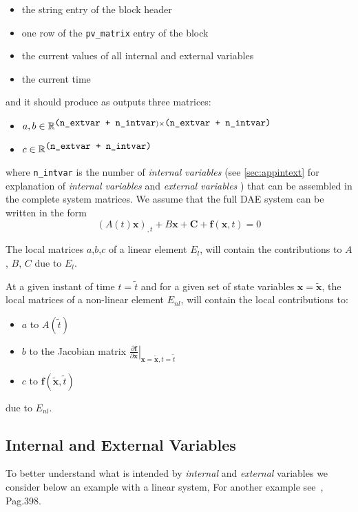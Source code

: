 \documentclass{scrartcl}
\begin{document}
\begin{itemize}
\item  the string entry of the block header
\item  one row of the {\tt pv\_matrix} entry of the block
\item  the current values of all internal and external variables
\item  the current time
\end{itemize} 

and it should produce as outputs three matrices: 
\begin{itemize}
\item  $a,b \in \mathbb{R}^{
\mbox{\tt (n\_extvar + n\_intvar})\times \mbox{\tt (n\_extvar + n\_intvar)}}$ 
\item $c\in \mathbb{R}^{\mbox{\tt (n\_extvar + n\_intvar)}} $ 
\end{itemize}


where {\tt n\_intvar} is the number of \emph{internal variables} 
(see \autoref{sec:appintext} for explanation of \emph{internal variables} and
 \emph{external variables} )
that can be assembled in the complete system matrices.
We assume that the full DAE system can be written in the form
\begin{equation}\label{eqdaesystem}
\left(A(t) \mathbf{x}\right)_{,t} + 
B \mathbf{x} + \mathbf{C} + \mathbf{f}(\mathbf{x},t)= 0
\end{equation}

The local matrices $a$,$b$,$c$ of a linear element $E_{l}$, 
will contain the contributions to $A$, $B$, $C$  due to
$E_{l}$.

At a given instant of time $t=\tilde{t}$ and for a given set of state 
variables $\mathbf{x}=\mathbf{\tilde{x}}$,
the local matrices of a non-linear element $E_{nl}$, 
will contain the local contributions to:
\begin{itemize}
\item $a$ to $A(\tilde{t})$
\item $b$ to the Jacobian matrix 
$\left.\frac{\partial \mathbf{f}}{\partial\mathbf{x}}\right|_{\mathbf{x}=
  \mathbf{\tilde{x}},t=\tilde{t}}$ 
\item $c$ to $\mathbf{f}(\mathbf{\tilde{x}},\tilde{t})$ 
\end{itemize}
due to $E_{nl}$.


\subsection{Internal and External Variables}\label{sec:appintext}
To better understand what is intended by \emph{internal} and \emph{external}
variables we consider below an example with a linear system,
For another example see~\cite{freund99}, Pag.398.
\end{document}
